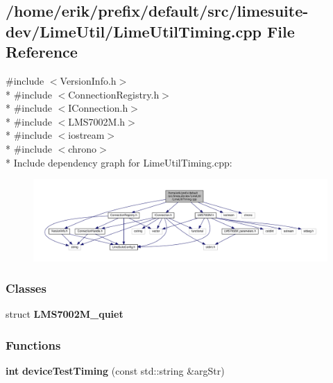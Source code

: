 \subsection{/home/erik/prefix/default/src/limesuite-\/dev/\+Lime\+Util/\+Lime\+Util\+Timing.cpp File Reference}
\label{LimeUtilTiming_8cpp}
{\ttfamily \#include $<$Version\+Info.\+h$>$}\\*
{\ttfamily \#include $<$Connection\+Registry.\+h$>$}\\*
{\ttfamily \#include $<$I\+Connection.\+h$>$}\\*
{\ttfamily \#include $<$L\+M\+S7002\+M.\+h$>$}\\*
{\ttfamily \#include $<$iostream$>$}\\*
{\ttfamily \#include $<$chrono$>$}\\*
Include dependency graph for Lime\+Util\+Timing.\+cpp\+:
\nopagebreak
\begin{figure}[H]
\begin{center}
\leavevmode
\includegraphics[width=350pt]{d3/d2b/LimeUtilTiming_8cpp__incl}
\end{center}
\end{figure}
\subsubsection*{Classes}
\begin{DoxyCompactItemize}
\item 
struct {\bf L\+M\+S7002\+M\+\_\+quiet}
\end{DoxyCompactItemize}
\subsubsection*{Functions}
\begin{DoxyCompactItemize}
\item 
{\bf int} {\bf device\+Test\+Timing} (const std\+::string \&arg\+Str)
\end{DoxyCompactItemize}


